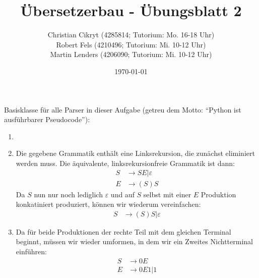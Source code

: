\documentclass[a4paper,10pt]{scrartcl}
\title{Übersetzerbau - Übungsblatt 2}
\author{Christian Cikryt (4285814; Tutorium: Mo. 16-18 Uhr)\\
  Robert Fels (4210496; Tutorium: Mi. 10-12 Uhr)\\
  Martin Lenders (4206090; Tutorium: Mi. 10-12 Uhr)
  }
\date{\today}
\begin{document}
\maketitle

\section{}
Basisklasse für alle Parser in dieser Aufgabe (getreu dem Motto: "`Python ist ausführbarer Pseudocode"'):

\begin{enumerate}
 \item  \hspace{0cm}
 \item  Die gegebene Grammatik enthält eine Linksrekursion, die zunächst eliminiert werden muss.
        Die äquivalente, linksrekursionfreie Grammatik ist dann:
        \begin{align*}
            S &\to SE | \varepsilon \\
            E &\to (S)S
        \end{align*}
        Da $S$ nun nur noch lediglich $\varepsilon$ und auf $S$ selbst mit einer $E$ Produktion konkatiniert produziert,
        können wir wiederum vereinfachen:
        \begin{align*}
            S &\to (S)S | \varepsilon
        \end{align*}
        
 \item	Da für beide Produktionen der rechte Teil mit dem gleichen Terminal beginnt, müssen wir wieder umformen, in dem wir ein 
        Zweites Nichtterminal einführen:
        \begin{align*}
            S &\to 0E \\
            E &\to 0E1 | 1
        \end{align*}
        
\end{enumerate}
\end{document}
